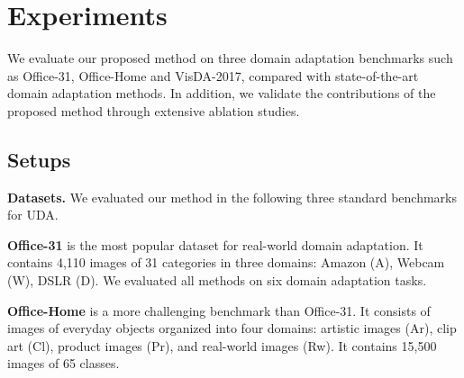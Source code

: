 \documentclass[final]{cvpr}
\begin{document}
\begin{table}[t]
\centering
\caption{Comparison of three different mixup-ratio rules on the task A$\rightarrow$W.}
\label{table1}
\end{table}

\section{Experiments}
We evaluate our proposed method on three domain adaptation benchmarks such as Office-31, Office-Home and VisDA-2017, compared with state-of-the-art domain adaptation methods. In addition, we validate the contributions of the proposed method through extensive ablation studies.
\subsection{Setups}
\textbf{Datasets.} We evaluated our method in the following three standard benchmarks for UDA.

\textbf{Office-31} \cite{Office-31} is the most popular dataset for real-world domain adaptation. It contains 4,110 images of 31 categories in three domains: Amazon (A), Webcam (W), DSLR (D). We evaluated all methods on six domain adaptation tasks. 

\textbf{Office-Home} \cite{Office-HOME} is a more challenging benchmark than Office-31. It consists of images of everyday objects organized into four domains: artistic images (Ar), clip art (Cl), product images (Pr), and real-world images (Rw). It contains 15,500 images of 65 classes. 
\end{document}
